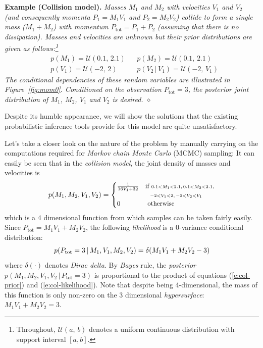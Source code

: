 \documentclass[]{article}
\newcommand{\otherwise}[1]{#1 &\text{ otherwise}}
\newcommand{\pr}{p}
\begin{document}
{\bf Example (Collision model). }
\emph{Masses $M_1$ and $M_2$ with velocities $V_1$ and $V_2$ (and consequently momenta $P_1 = M_1 V_1$ and $P_2 = M_2 V_2$) collide to form a single mass ($M_1 + M_2$) with momentum $P_\text{tot} = P_1 + P_2$ (assuming that there is no dissipation).
Masses and velocities are unknown but 
their prior distributions are given as follows:\footnote{
Throughout, $\mathcal{U}(a, \, b)$ denotes a uniform continuous distribution 
with support interval $[a, b]$.
} 
}%
{\footnotesize \vspace{-0.5mm}
\begin{align}
&\pr(M_1) = \mathcal{U}(0.1, \, 2.1) 
&&\pr(M_2) \!=\! \mathcal{U}(0.1, \, 2.1)
\nonumber
\\
&\pr(V_1) = \mathcal{U}(-2, \, 2)
&&\pr(V_2 \, | \, V_1) = \mathcal{U}(-2, \, V_1)
\label{e:collision}
\end{align} 
}
\emph{
\!\!\!The conditional dependencies of these random variables are illustrated in 
Figure~\ref{fig:mom0}. %
Conditioned on the observation $P_{\text{tot}} = 3$, the posterior joint distribution of $M_1$, $M_2$, $V_1$ and $V_2$ is desired. 
\hspace*{\fill} $\diamond$} %

Despite its humble appearance, we will show the solutions that the existing probabilistic inference tools provide for this model are quite unsatisfactory. 

Let's take a closer look on the nature of the problem by manually carrying on the computations required for 
\emph{Markov chain Monte Carlo} (MCMC) sampling:
It can easily be seen that in the \emph{collision model}, 
the joint density of masses and velocities is
\begin{equation} \footnotesize  
\label{e:col-prior}
\pr(M_1, M_2, V_1, V_2)  
=
\begin{cases}
\frac{1}{16 V_1 + 32} &{\text{if }\scriptstyle 0.1<M_1<2.1, \, 0.1<M_2<2.1,}\\
							 &{\;\;\, \scriptstyle -2<V_1<2, \, -2<V_2 < V_1}\\
 \otherwise{0}
 \end{cases}
\end{equation}
which is a 4 dimensional function from which samples can be taken fairly easily. 
Since {\footnotesize $P_\text{tot} = M_1 V_1 + M_2 V_2$}, 
the following \emph{likelihood} is a 0-variance conditional distribution:
\begin{equation}\footnotesize 
\label{e:col-likelihood}
\pr(P_\text{tot} = 3 \,|\, M_1, V_1, M_2, V_2) = \delta( M_1 V_1 + M_2 V_2 - 3)
\end{equation}
where $\delta(\cdot)$ denotes \emph{Dirac delta}. 
By \emph{Bayes} rule, 
the \emph{posterior} 
{\footnotesize $\pr(M_1, M_2, V_1, V_2 \,|\, P_\text{tot} = 3)$}
is proportional to the product of equations (\ref{e:col-prior}) and (\ref{e:col-likelihood}).
Note that despite being 4-dimensional, 
the mass of this function is only non-zero on the 3 dimensional \emph{hypersurface}: {\footnotesize$M_1 V_1 + M_2 V_2 = 3$}. 
\end{document}
